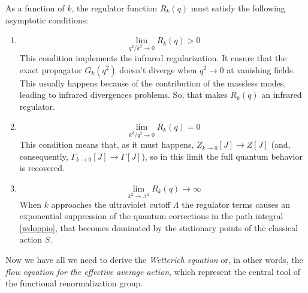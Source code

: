 As a function of $k$, the regulator function $R_k(q)$ must satisfy the following asymptotic conditions:
\begin{enumerate}
 \item 
 \begin{equation}\label{relazione1}
  \lim_{q^2/k^2 \to 0} R_k(q) > 0
  \end{equation}
       This condition implements the infrared regularization. It ensure that the exact propagator
       $G_k(q^2)$ doesn't diverge when $q^2\to 0$ at vanishing fields. 
       This usually happens because of the contribution of the massless modes, leading to infrared divergences problems. 
       So, that makes $R_k(q)$ an infrared regulator.
\item \begin{equation}\label{relazione2}
       \lim_{k^2/q^2 \to 0} R_k(q) = 0
      \end{equation}
        This condition means that, as it must happens, $Z_{k \to 0}[J] \to Z[J]$ 
       (and, consequently, $\Gamma_{k \to 0}[J] \to \Gamma[J]$), so in this limit the full quantum behavior is recovered.
\item \begin{equation}\label{relazione3}
\lim_{k^2 \to \Lambda^2} R_k(q) \rightarrow \infty
\end{equation}
     When $k$ approaches the ultraviolet cutoff $\Lambda$ the regulator terms causes an exponential suppression of the quantum 
     corrections in the path integral \eqref{wdoppio}, that becomes dominated by the stationary points of the classical action $S$. 
\end{enumerate}
Now we have all we need to derive the \emph{Wetterich equation} or, in other words, the \emph{flow equation for the effective average action}, 
which represent the central tool of the functional renormalization group.

